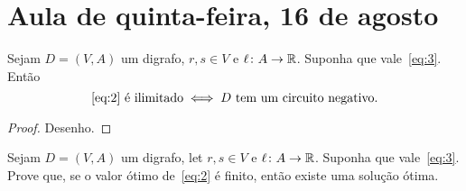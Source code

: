 \documentclass[10pt,reqno]{amsart}
\begin{document}
\section{Aula de quinta-feira, 16 de agosto}

\begin{proposition}
  \label{prop:2}
  Sejam \(D = (V,A)\) um digrafo, \(r,s \in V\) e
  \(\ell \colon A \to \mathbb{R}\).  Suponha que vale~\eqref{eq:3}.
  Então
  \begin{equation}
    \label{eq:5}
    \text{\eqref{eq:2} é ilimitado}
    \iff
    \text{\(D\) tem um circuito negativo}.
  \end{equation}
\end{proposition}
\begin{proof} Desenho.
  
\end{proof}

\begin{exercise}
  \label{ex:4}
  Sejam \(D = (V,A)\) um digrafo, let \(r,s \in V\) e
  \(\ell \colon A \to \mathbb{R}\).  Suponha que vale~\eqref{eq:3}.
  Prove que, se o valor ótimo de~\eqref{eq:2} é finito, então
  existe uma solução ótima.
\end{exercise}
\end{document}

